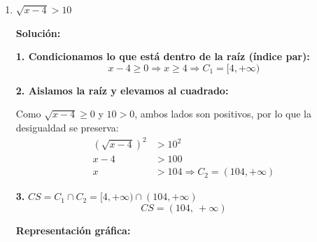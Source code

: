 \documentclass[12pt]{article}
\newcommand{\solucion}{%
    \vspace{0.8em}%
    \textbf{Solución:}%
}
\begin{document}
\begin{enumerate}[label=\alph*.-]
    \textbf{5.} $C_2 = (-\infty, -2) \cup [5-3\sqrt{5},\ 5+3\sqrt{5}]$

    \textbf{6.} $CS = C_1 \cap C_2 = (\mathbb{R} - \{-5,-2\}) \cap \left((-\infty,-2) \cup [5-3\sqrt{5},\ 5+3\sqrt{5}]\right)$
    \[
    \boxed{CS = (-\infty,\ -2) \cup [5-3\sqrt{5},\ 5+3\sqrt{5}]}
    \]

    \newpage
    \textbf{Representación gráfica:}

    \begin{center}
    \end{center}

    \item $\sqrt{x-4} > 10$

    \solucion

    \textbf{1. Condicionamos lo que está dentro de la raíz (índice par):}
    \[
    x - 4 \geq 0 \Rightarrow x \geq 4 \Rightarrow C_1 = [4, +\infty)
    \]

    \textbf{2. Aislamos la raíz y elevamos al cuadrado:}

    Como $\sqrt{x-4} \geq 0$ y $10 > 0$, ambos lados son positivos, por lo que la desigualdad se preserva:
    \begin{align*}
    \left(\sqrt{x-4}\right)^2 &> 10^2 \\[0.3em]
    x - 4 &> 100 \\[0.3em]
    x &> 104 \Rightarrow C_2 = (104, +\infty)
    \end{align*}

    \textbf{3.} $CS = C_1 \cap C_2 = [4, +\infty) \cap (104, +\infty)$
    \[
    \boxed{CS = (104,\ +\infty)}
    \]

    \textbf{Representación gráfica:}

    \begin{center}
\end{center}
\end{enumerate}
\end{document}
